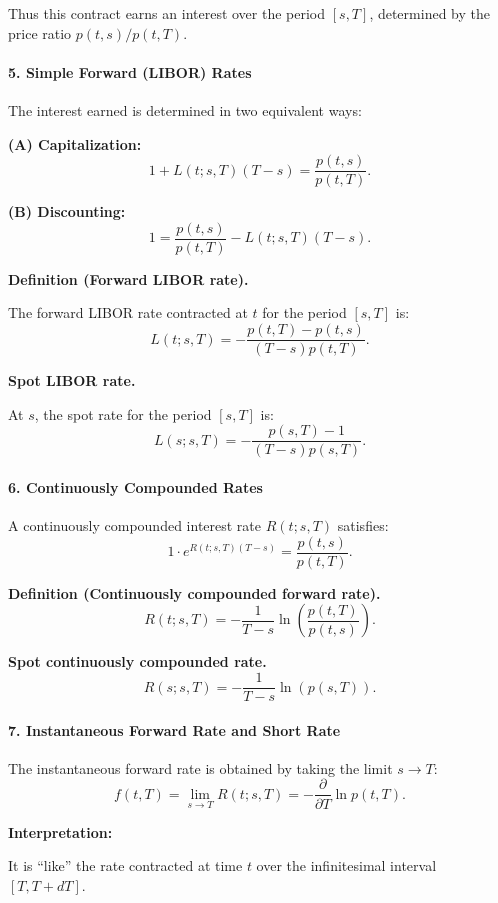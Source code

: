 \documentclass[12pt,a4paper]{article}
\theoremstyle{definition}
\begin{document}
Thus this contract earns an interest over the period $[s, T]$, determined by the price ratio $p(t, s)/p(t, T)$.

\paragraph{5. Simple Forward (LIBOR) Rates}

The interest earned is determined in two equivalent ways:

\textbf{(A) Capitalization:}
\[
1 + L(t; s, T)(T - s) = \frac{p(t, s)}{p(t, T)}.
\]

\textbf{(B) Discounting:}
\[
1 = \frac{p(t, s)}{p(t, T)} - L(t; s, T)(T - s).
\]

\textbf{Definition (Forward LIBOR rate).}

The forward LIBOR rate contracted at $t$ for the period $[s, T]$ is:
\[
L(t; s, T) = -\frac{p(t, T) - p(t, s)}{(T - s)p(t, T)}.
\]

\textbf{Spot LIBOR rate.}

At $s$, the spot rate for the period $[s, T]$ is:
\[
L(s; s, T) = -\frac{p(s, T) - 1}{(T - s)p(s, T)}.
\]

\paragraph{6. Continuously Compounded Rates}

A continuously compounded interest rate $R(t; s, T)$ satisfies:
\[
1 \cdot e^{R(t; s, T)(T - s)} = \frac{p(t, s)}{p(t, T)}.
\]

\textbf{Definition (Continuously compounded forward rate).}
\[
R(t; s, T) = -\frac{1}{T - s} \ln\!\left(\frac{p(t, T)}{p(t, s)}\right).
\]

\textbf{Spot continuously compounded rate.}
\[
R(s; s, T) = -\frac{1}{T - s} \ln(p(s, T)).
\]

\paragraph{7. Instantaneous Forward Rate and Short Rate}

The instantaneous forward rate is obtained by taking the limit $s \to T$:
\[
f(t, T) = \lim_{s \to T} R(t; s, T) = -\frac{\partial}{\partial T} \ln p(t, T).
\]

\textbf{Interpretation:}

It is ``like'' the rate contracted at time $t$ over the infinitesimal interval $[T, T + dT]$.
\end{document}
